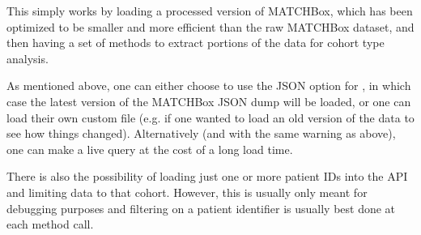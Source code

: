 \documentclass[letterpaper,10pt,english]{sphinxmanual}
\begin{document}
%
\begin{sphinxVerbatim}[commandchars=\\\{\}]
   
  
 
\end{sphinxVerbatim}

This simply works by loading a processed version of MATCHBox, which has been
optimized to be smaller and more efficient than the raw MATCHBox dataset, and
then having a set of methods to extract portions of the data for cohort type
analysis.

As mentioned above, one can either choose to use the  JSON option
for , in which case the latest version of the MATCHBox JSON dump will
be loaded, or one can load their own custom file (e.g. if one wanted to load an old
version of the data to see how things changed).  Alternatively (and with the same
warning as above), one can make a live query at the cost of a long load time.

There is also the possibility of loading just one or more patient IDs into the API
and limiting data to that cohort.  However, this is usually only meant for
debugging purposes and filtering on a patient identifier is usually best done at
each method call.
\end{document}
